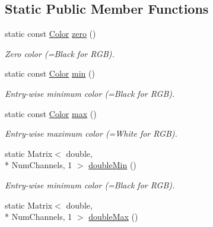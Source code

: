 \subsection*{Static Public Member Functions}
\begin{DoxyCompactItemize}
\item 
\hypertarget{struct_d_o_1_1_color_traits_aef35bf35a1f3fbe0fb53bde998f12937}{static const \hyperlink{struct_d_o_1_1_color_traits_a8d45fa3ac7947ce1caba83d2bad66677}{Color} \hyperlink{struct_d_o_1_1_color_traits_aef35bf35a1f3fbe0fb53bde998f12937}{zero} ()}\label{struct_d_o_1_1_color_traits_aef35bf35a1f3fbe0fb53bde998f12937}

\begin{DoxyCompactList}\small\item\em Zero color (=Black for R\-G\-B). \end{DoxyCompactList}\item 
\hypertarget{struct_d_o_1_1_color_traits_a78baae966b690cee8810329019841a65}{static const \hyperlink{struct_d_o_1_1_color_traits_a8d45fa3ac7947ce1caba83d2bad66677}{Color} \hyperlink{struct_d_o_1_1_color_traits_a78baae966b690cee8810329019841a65}{min} ()}\label{struct_d_o_1_1_color_traits_a78baae966b690cee8810329019841a65}

\begin{DoxyCompactList}\small\item\em Entry-\/wise minimum color (=Black for R\-G\-B). \end{DoxyCompactList}\item 
\hypertarget{struct_d_o_1_1_color_traits_a363300396ad213712625fdc984648f2e}{static const \hyperlink{struct_d_o_1_1_color_traits_a8d45fa3ac7947ce1caba83d2bad66677}{Color} \hyperlink{struct_d_o_1_1_color_traits_a363300396ad213712625fdc984648f2e}{max} ()}\label{struct_d_o_1_1_color_traits_a363300396ad213712625fdc984648f2e}

\begin{DoxyCompactList}\small\item\em Entry-\/wise maximum color (=White for R\-G\-B). \end{DoxyCompactList}\item 
\hypertarget{struct_d_o_1_1_color_traits_a2842b58e25ca3ad8048353e30362e784}{static Matrix$<$ double, \\*
Num\-Channels, 1 $>$ \hyperlink{struct_d_o_1_1_color_traits_a2842b58e25ca3ad8048353e30362e784}{double\-Min} ()}\label{struct_d_o_1_1_color_traits_a2842b58e25ca3ad8048353e30362e784}

\begin{DoxyCompactList}\small\item\em Entry-\/wise minimum color (=Black for R\-G\-B). \end{DoxyCompactList}\item 
\hypertarget{struct_d_o_1_1_color_traits_a41190a80640221fab7f3b6de0f2cc8dc}{static Matrix$<$ double, \\*
Num\-Channels, 1 $>$ \hyperlink{struct_d_o_1_1_color_traits_a41190a80640221fab7f3b6de0f2cc8dc}{double\-Max} ()}\label{struct_d_o_1_1_color_traits_a41190a80640221fab7f3b6de0f2cc8dc}


\end{DoxyCompactItemize}
